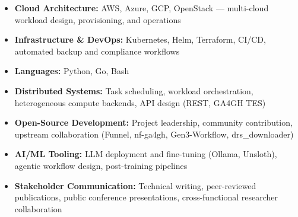 






\begin{itemize}
    \item \textbf{Cloud Architecture:} AWS, Azure, GCP, OpenStack --- multi-cloud workload design, provisioning, and operations
    \item \textbf{Infrastructure \& DevOps:} Kubernetes, Helm, Terraform, CI/CD, automated backup and compliance workflows
    \item \textbf{Languages:} Python, Go, Bash
    \item \textbf{Distributed Systems:} Task scheduling, workload orchestration, heterogeneous compute backends, API design (REST, GA4GH TES)
    \item \textbf{Open-Source Development:} Project leadership, community contribution, upstream collaboration (Funnel, nf-ga4gh, Gen3-Workflow, drs\_downloader)
    \item \textbf{AI/ML Tooling:} LLM deployment and fine-tuning (Ollama, Unsloth), agentic workflow design, post-training pipelines
    \item \textbf{Stakeholder Communication:} Technical writing, peer-reviewed publications, public conference presentations, cross-functional researcher collaboration
\end{itemize}


\newpage

\vspace*{\baselineskip}




\vfill \myBreak{}


